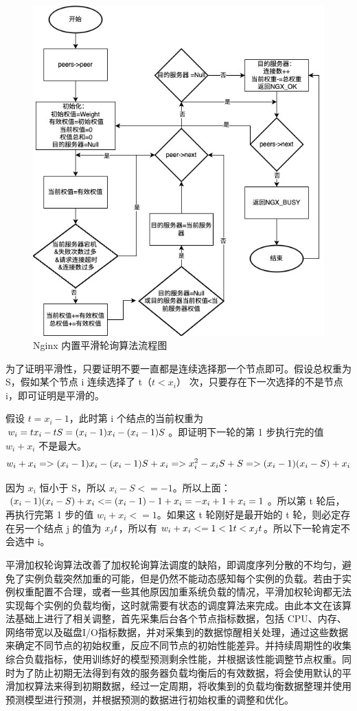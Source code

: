 \begin{figure}[htbp]
  \centering
  \includegraphics[width=.8\textwidth]{figures/smooth_weight.jpg}
  \caption{Nginx 内置平滑轮询算法流程图}
  \label{pinghualunxun}
\end{figure}

为了证明平滑性，只要证明不要一直都是连续选择那一个节点即可。假设总权重为 S，假如某个节点 i 连续选择了 t（$t < x_i$） 次，只要存在下一次选择的不是节点 i，即可证明是平滑的。

假设 $t = x_i - 1$，此时第 i 个结点的当前权重为 $w_i = t \* x_i - t \* S = (x_i - 1) \* x_i - (x_i - 1) \* S$。即证明下一轮的第 1 步执行完的值 $w_i + x_i$ 不是最大。
\begin{equation}
  w_i + x_i => (x_i - 1) \* x_i - (x_i - 1) \* S + x_i =>x_i^2 - x_i \* S + S => (x_i - 1) \* (x_i - S) + x_i
\end{equation}

因为 $x_i$ 恒小于 S，所以 $x_i - S <= -1$。所以上面：$(x_i - 1) \* (x_i - S) + x_i <= (x_i - 1) \* -1 + x_i = -x_i + 1 + x_i = 1$。所以第 t 轮后，再执行完第 1 步的值 $w_i + x_i <= 1$。如果这 t 轮刚好是最开始的 t 轮，则必定存在另一个结点 j 的值为 $x_j \* t$，所以有 $w_i + x_i <= 1 < 1 \* t < x_j \* t$。所以下一轮肯定不会选中 i。

平滑加权轮询算法改善了加权轮询算法调度的缺陷，即调度序列分散的不均匀，避免了实例负载突然加重的可能，但是仍然不能动态感知每个实例的负载。若由于实例权重配置不合理，或者一些其他原因加重系统负载的情况，平滑加权轮询都无法实现每个实例的负载均衡，这时就需要有状态的调度算法来完成。由此本文在该算法基础上进行了相关调整，首先采集后台各个节点指标数据，包括 CPU、内存、网络带宽以及磁盘I/O指标数据，并对采集到的数据惊醒相关处理，通过这些数据来确定不同节点的初始权重，反应不同节点的初始性能差异。并持续周期性的收集综合负载指标，使用训练好的模型预测剩余性能，并根据该性能调整节点权重。同时为了防止初期无法得到有效的服务器负载均衡后的有效数据，将会使用默认的平滑加权算法来得到初期数据，经过一定周期，将收集到的负载均衡数据整理并使用预测模型进行预测，并根据预测的数据进行初始权重的调整和优化。

